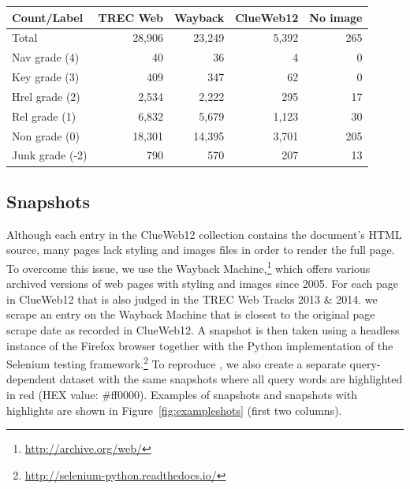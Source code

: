 \begin{table}[h]
  \label{tab:countsources}
  \begin{tabular}{ l  @{}r  r  r  r }
  \toprule
    Count/Label & TREC Web & Wayback & ClueWeb12 & \mbox{}\hspace*{-.15cm}No image\\
    \midrule
    Total & 28,906 & 23,249 & 5,392 & 265 \\
    Nav grade (4) & 40 & 36 & 4 & 0\\
    Key grade (3) & 409 & 347 & 62 & 0\\
    Hrel grade (2) & 2,534 & 2,222 & 295 & 17 \\
    Rel grade (1) & 6,832 & 5,679 & 1,123 & 30\\
    Non grade (0) & 18,301 & 14,395 & 3,701 & 205 \\
    Junk grade (-2) & 790 & 570 & 207 & 13\\
    \bottomrule
  \end{tabular} 
\end{table}


\subsection{Snapshots} \label{sec:screenshotsec}
Although each entry in the ClueWeb12 collection contains the document's HTML source, many pages lack styling and images files in order to render the full page.
To overcome this issue, we use the Wayback Machine,\footnote{\url{http://archive.org/web/}} which offers various archived versions of web pages with styling and images since 2005.
For each page in ClueWeb12 that is also judged in the TREC Web Tracks 2013 \& 2014.
we scrape an entry on the Wayback Machine that is closest to the original page scrape date as recorded in ClueWeb12.
A snapshot is then taken using a headless instance of the Firefox browser together with the Python implementation of the Selenium testing framework.\footnote{\url{http://selenium-python.readthedocs.io/}}
To reproduce \cite{fan2017learning}, we also create a separate query-dependent dataset with the same snapshots where all query words are highlighted in red (HEX value: \#ff0000).
Examples of snapshots and snapshots with highlights are shown in Figure~\ref{fig:exampleshots} (first two columns). 

